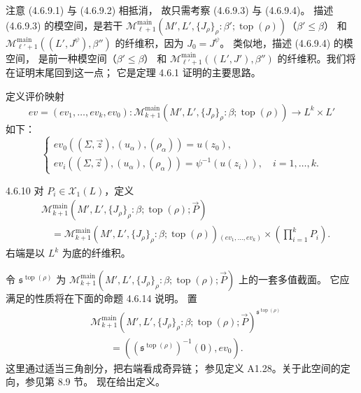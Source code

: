 注意 (4.6.9.1) 与 (4.6.9.2) 相抵消，
故只需考察 (4.6.9.3) 与 (4.6.9.4)。
描述 (4.6.9.3) 的模空间，是若干
$\mathcal M_{\ell+1}^{\mathrm{main}}
(M',L',\{J_\rho\}_\rho:\beta';
\operatorname{top}(\rho))$（$\beta'\le\beta$）
和
$\mathcal M_{\ell'+1}^{\mathrm{main}}
((L',J^\psi),\beta'')$
的纤维积，因为 $J_0=J^\psi$。
类似地，描述 (4.6.9.4) 的模空间，
是前一种模空间（$\beta'\le\beta$）
和
$\mathcal M_{\ell'+1}^{\mathrm{main}}
((L',J'),\beta'')$
的纤维积。我们将在证明末尾回到这一点；
它是定理 4.6.1 证明的主要思路。

定义评价映射
\[
 ev=(ev_1,\ldots,ev_k,ev_0)\colon
 \mathcal M_{k+1}^{\mathrm{main}}
 (M',L',\{J_\rho\}_\rho:\beta;\operatorname{top}(\rho))
 \longrightarrow L^k\times L'
\]
如下：
\[
 \begin{cases}
 ev_0((\Sigma,\vec z),(u_\alpha),(\rho_\alpha))
 =u(z_0),\\
 ev_i((\Sigma,\vec z),(u_\alpha),(\rho_\alpha))
 =\psi^{-1}(u(z_i)),
 \quad i=1,\ldots,k.
 \end{cases}
\]

\begin{definition}{4.6.10}\label{def:4-6-10}
对 $P_i\in\mathcal X_1(L)$，定义
\[
 \begin{aligned}
 &\mathcal M_{k+1}^{\mathrm{main}}
 (M',L',\{J_\rho\}_\rho:\beta;\operatorname{top}(\rho);\vec P)\\
 &\quad=
 \mathcal M_{k+1}^{\mathrm{main}}
 (M',L',\{J_\rho\}_\rho:\beta;\operatorname{top}(\rho))
 {}_{(ev_1,\ldots,ev_k)}\!\times
 \left(\prod_{i=1}^kP_i\right).
 \end{aligned}
\]
右端是以 $L^k$ 为底的纤维积。
\end{definition}

令 $\mathfrak s^{\operatorname{top}(\rho)}$
为
$\mathcal M_{k+1}^{\mathrm{main}}
(M',L',\{J_\rho\}_\rho:\beta;\operatorname{top}(\rho);\vec P)$
上的一套多值截面。
它应满足的性质将在下面的命题 4.6.14 说明。
置
\begin{equation}
 \begin{aligned}
 &\mathcal M_{k+1}^{\mathrm{main}}
 (M',L',\{J_\rho\}_\rho:\beta;\operatorname{top}(\rho);\vec P)
 ^{\mathfrak s^{\operatorname{top}(\rho)}}\\
 &\qquad=
 ((\mathfrak s^{\operatorname{top}(\rho)})^{-1}(0),ev_0).
 \end{aligned}
\tag{4.6.11}\label{eq:4-6-11}
\end{equation}
这里通过适当三角剖分，把右端看成奇异链；
参见定义 A1.28。关于此空间的定向，参见第 8.9 节。
现在给出定义。


